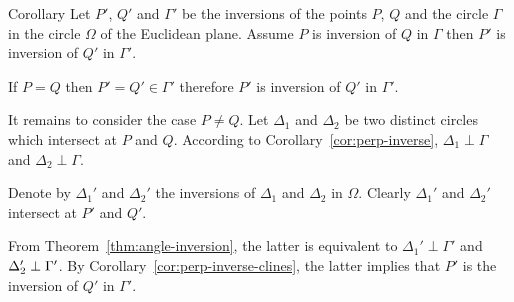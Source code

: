\begin{thm}{Corollary}\label{cor:invese-comp}
Let $P'$, $Q'$ and $\Gamma'$ 
be the inversions of the points $P$, $Q$ and the circle $\Gamma$ in the circle $\Omega$ of the Euclidean plane.
Assume $P$ is inversion of $Q$ in $\Gamma$ then 
$P'$ is inversion of $Q'$ in $\Gamma'$.
\end{thm}

If $P=Q$ then $P'=Q'\in\Gamma'$ therefore $P'$ is inversion of $Q'$ in $\Gamma'$.

It remains to consider the case $P\ne Q$. 
Let $\Delta_1$ and $\Delta_2$ be two distinct circles which intersect at $P$ and $Q$.
According to Corollary~\ref{cor:perp-inverse}, 
$\Delta_1\perp\Gamma$ and $\Delta_2\perp\Gamma$.

Denote by $\Delta_1'$ and $\Delta_2'$ the inversions of $\Delta_1$ and $\Delta_2$ in $\Omega$.
Clearly $\Delta_1'$ and $\Delta_2'$ intersect at $P'$ and $Q'$.

From Theorem~\ref{thm:angle-inversion}, 
the latter is equivalent 
to $\Delta_1'\perp\Gamma'$ and $\Delta_2'\z\perp\Gamma'$.
By Corollary~\ref{cor:perp-inverse-clines},
the latter implies that $P'$ is the inversion of $Q'$ in $\Gamma'$.
\qeds

